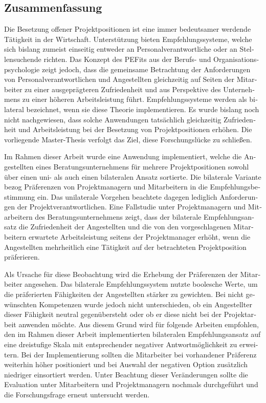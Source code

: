 \begin{otherlanguage}{ngerman}
\chapter*{Zusammenfassung}
Die Besetzung offener Projektpositionen ist eine immer bedeutsamer werdende Tätigkeit in der Wirtschaft. Unterstützung bieten Empfehlungssysteme, welche sich bislang zumeist einseitig entweder an Personalverantwortliche oder an Stellensuchende richten. Das Konzept des \aclp{PEFit} aus der Berufs- und Organisationspsychologie zeigt jedoch, dass die gemeinsame Betrachtung der Anforderungen von Personalverantwortlichen und Angestellten gleichzeitig auf Seiten der Mitarbeiter zu einer ausgeprägteren Zufriedenheit und aus Perspektive des Unternehmens zu einer höheren Arbeitsleistung führt. Empfehlungssysteme werden als bilateral bezeichnet, wenn sie diese Theorie implementieren. Es wurde bislang noch nicht nachgewiesen, dass solche Anwendungen tatsächlich gleichzeitig Zufriedenheit und Arbeitsleistung bei der Besetzung von Projektpositionen erhöhen. Die vorliegende Master-Thesis verfolgt das Ziel, diese Forschungslücke zu schließen.

Im Rahmen dieser Arbeit wurde eine Anwendung implementiert, welche die Angestellten eines Beratungsunternehmens für mehrere Projektpositionen sowohl über einen uni- als auch einen bilateralen Ansatz sortierte. Die bilaterale Variante bezog Präferenzen von Projektmanagern und Mitarbeitern in die Empfehlungsbestimmung ein. Das unilaterale Vorgehen beachtete dagegen lediglich Anforderungen der Projektverantwortlichen. Eine Fallstudie unter Projektmanagern und Mitarbeitern des Beratungsunternehmens zeigt, dass der bilaterale Empfehlungsansatz die Zufriedenheit der Angestellten und die von den vorgeschlagenen Mitarbeitern erwartete Arbeitsleistung seitens der Projektmanager erhöht, wenn die Angestellten mehrheitlich eine Tätigkeit auf der betrachteten Projektposition präferieren.

Als Ursache für diese Beobachtung wird die Erhebung der Präferenzen der Mitarbeiter angesehen. Das bilaterale Empfehlungssystem nutzte boolesche Werte, um die präferierten Fähigkeiten der Angestellten stärker zu gewichten. Bei nicht gewünschten Kompetenzen wurde jedoch nicht unterschieden, ob ein Angestellter dieser Fähigkeit neutral gegenübersteht oder ob er diese nicht bei der Projektarbeit anwenden möchte. Aus diesem Grund wird für folgende Arbeiten empfohlen, den im Rahmen dieser Arbeit implementierten bilateralen Empfehlungsansatz auf eine dreistufige Skala mit entsprechender negativer Antwortmöglichkeit zu erweitern. Bei der Implementierung sollten die Mitarbeiter bei vorhandener Präferenz weiterhin höher positioniert und bei Auswahl der negativen Option zusätzlich niedriger einsortiert werden. Unter Beachtung dieser Veränderungen sollte die Evaluation unter Mitarbeitern und Projektmanagern nochmals durchgeführt und die Forschungsfrage erneut untersucht werden.
\end{otherlanguage}
